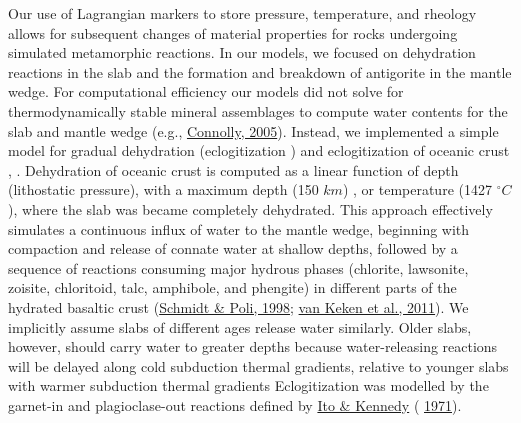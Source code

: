 \documentclass[draft,linenumbers]{agujournal2018}
\providecommand{\DIFaddtex}[1]{{\protect\color{blue} \sf #1}} %
\providecommand{\DIFdeltex}[1]{{\protect\color{red} \scriptsize #1}} %
\providecommand{\DIFaddbegin}{} %
\providecommand{\DIFaddend}{} %
\providecommand{\DIFdelbegin}{} %
\providecommand{\DIFdelend}{} %
\providecommand{\DIFadd}[1]{\texorpdfstring{\DIFaddtex{#1}}{#1}} %
\providecommand{\DIFdel}[1]{\texorpdfstring{\DIFdeltex{#1}}{}} %
\begin{document}
Our use of Lagrangian markers to store pressure, temperature, and
rheology allows for subsequent changes of material properties for rocks
undergoing simulated metamorphic reactions. In our models, we focused on
dehydration reactions in the slab and the formation and breakdown of
antigorite in the mantle wedge. For computational efficiency our models
did not solve for thermodynamically stable mineral assemblages to
compute water contents for the slab and mantle wedge (e.g.,
\protect\hyperlink{ref-Connolly2005}{Connolly, 2005}). Instead, we
implemented a simple model for gradual dehydration \DIFdelbegin \DIFdel{(eclogitization ) }\DIFdelend \DIFaddbegin \DIFadd{and eclogitization }\DIFaddend of
oceanic crust\DIFdelbegin \DIFdel{, }\DIFdelend \DIFaddbegin \DIFadd{. Dehydration of oceanic crust is }\DIFaddend computed as a linear
function of depth (lithostatic pressure), with a maximum depth (150
\(km\))\DIFaddbegin \DIFadd{, or temperature (1427 \(^\circ C\)), }\DIFaddend where the slab \DIFdelbegin \DIFdel{was
}\DIFdelend \DIFaddbegin \DIFadd{became
}\DIFaddend completely dehydrated. This approach effectively simulates a continuous
influx of water to the mantle wedge, beginning with compaction and
release of connate water at shallow depths, followed by a sequence of
reactions consuming major hydrous phases (chlorite, lawsonite, zoisite,
chloritoid, talc, amphibole, and phengite) in different parts of the
hydrated basaltic crust (\protect\hyperlink{ref-Schmidt1998}{Schmidt \&
Poli, 1998}; \protect\hyperlink{ref-VanKeken2011}{van Keken et al.,
2011}). \DIFdelbegin \DIFdel{We implicitly assume slabs of different ages release water
similarly. Older slabs, however, should carry water to greater depths
because water-releasing reactions will be delayed along cold subduction
thermal gradients, relative to younger slabs with warmer subduction
thermal gradients }\DIFdelend \DIFaddbegin \DIFadd{Eclogitization was modelled by the garnet-in and plagioclase-out
reactions defined by }\protect\hyperlink{ref-Ito1971}{Ito \& Kennedy}
\DIFaddend (\protect\DIFdelbegin %
\DIFdelend \DIFaddbegin \hyperlink{ref-Ito1971}{1971}\DIFaddend ).
\end{document}
